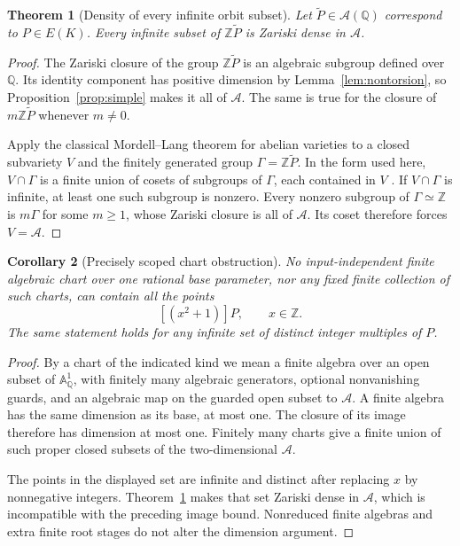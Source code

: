 \documentclass[11pt]{article}
\newtheorem{theorem}{Theorem}
\newtheorem{corollary}[theorem]{Corollary}
\newcommand{\Q}{\mathbb Q}
\newcommand{\Z}{\mathbb Z}
\begin{document}
\begin{theorem}[Density of every infinite orbit subset]
\label{thm:dense}
Let \(\widetilde P\in\mathcal A(\Q)\) correspond
to \(P\in E(K)\). Every infinite subset of
\(\Z\widetilde P\) is Zariski dense in
\(\mathcal A\).
\end{theorem}
\begin{proof}
The Zariski closure of the group
\(\Z\widetilde P\) is an algebraic subgroup defined
over \(\Q\). Its identity component has positive
dimension by Lemma~\ref{lem:nontorsion}, so
Proposition~\ref{prop:simple} makes it all of
\(\mathcal A\). The same is true for the closure
of \(m\Z\widetilde P\) whenever \(m\ne0\).

Apply the classical Mordell--Lang theorem for
abelian varieties to a closed subvariety \(V\)
and the finitely generated group
\(\Gamma=\Z\widetilde P\). In the form used here,
\(V\cap\Gamma\) is a finite union of cosets of
subgroups of \(\Gamma\), each contained in \(V\)
\cite{Faltings,Mazur}. If \(V\cap\Gamma\) is
infinite, at least one such subgroup is nonzero.
Every nonzero subgroup of \(\Gamma\simeq\Z\) is
\(m\Gamma\) for some \(m\ge1\), whose Zariski
closure is all of \(\mathcal A\).
Its coset therefore forces \(V=\mathcal A\).
\end{proof}

\begin{corollary}[Precisely scoped chart obstruction]
\label{cor:oneparameter}
No input-independent finite algebraic chart over
one rational base parameter, nor any fixed finite
collection of such charts, can contain all the
points
\[
                        [(x^2+1)]P,\qquad x\in\Z .
\]
The same statement holds for any infinite set of
distinct integer multiples of \(P\).
\end{corollary}
\begin{proof}
By a chart of the indicated kind we mean a finite
algebra over an open subset of \(\mathbb A^1_\Q\),
with finitely many algebraic generators, optional
nonvanishing guards, and an algebraic map on the
guarded open subset to \(\mathcal A\).
A finite algebra has the same dimension as its
base, at most one. The closure of its image
therefore has dimension at most one. Finitely
many charts give a finite union of such proper
closed subsets of the two-dimensional
\(\mathcal A\).

The points in the displayed set are infinite
and distinct after replacing \(x\) by nonnegative
integers. Theorem~\ref{thm:dense} makes that set
Zariski dense in \(\mathcal A\), which is
incompatible with the preceding image bound.
Nonreduced finite algebras and extra finite root
stages do not alter the dimension argument.
\end{proof}
\end{document}
